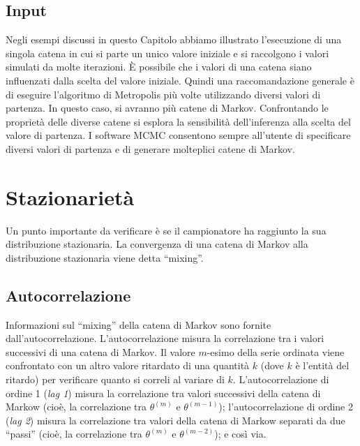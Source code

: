 \documentclass[
  11pt,
]{krantz}
\theoremstyle{definition}
\theoremstyle{definition}
\theoremstyle{definition}
\theoremstyle{definition}
\theoremstyle{remark}
\begin{document}
\hypertarget{input}{%
\subsection{Input}\label{input}}

Negli esempi discussi in questo Capitolo abbiamo illustrato l'esecuzione di una singola catena in cui si parte un unico valore iniziale e si raccolgono i valori simulati da molte iterazioni. È possibile che i valori di una catena siano influenzati dalla scelta del valore iniziale. Quindi una raccomandazione generale è di eseguire l'algoritmo di Metropolis più volte utilizzando diversi valori di partenza. In questo caso, si avranno più catene di Markov. Confrontando le proprietà delle diverse catene si esplora la sensibilità dell'inferenza alla scelta del valore di partenza. I software MCMC consentono sempre all'utente di specificare diversi valori di partenza e di generare molteplici catene di Markov.

\hypertarget{stazionarietuxe0}{%
\section{Stazionarietà}\label{stazionarietuxe0}}

Un punto importante da verificare è se il campionatore ha raggiunto la sua distribuzione stazionaria. La convergenza di una catena di Markov alla distribuzione stazionaria viene detta ``mixing''.

\hypertarget{approx-post-autocor}{%
\subsection{Autocorrelazione}\label{approx-post-autocor}}

Informazioni sul ``mixing'' della catena di Markov sono fornite dall'autocorrelazione. L'autocorrelazione misura la correlazione tra i valori successivi di una catena di Markov. Il valore \(m\)-esimo della serie ordinata viene confrontato con un altro valore ritardato di una quantità \(k\) (dove \(k\) è l'entità del ritardo) per verificare quanto si correli al variare di \(k\). L'autocorrelazione di ordine 1 (\emph{lag 1}) misura la correlazione tra valori successivi della catena di Markow (cioè, la correlazione tra \(\theta^{(m)}\) e \(\theta^{(m-1)}\)); l'autocorrelazione di ordine 2 (\emph{lag 2}) misura la correlazione tra valori della catena di Markow separati da due ``passi'' (cioè, la correlazione tra \(\theta^{(m)}\) e \(\theta^{(m-2)}\)); e così via.
\end{document}
